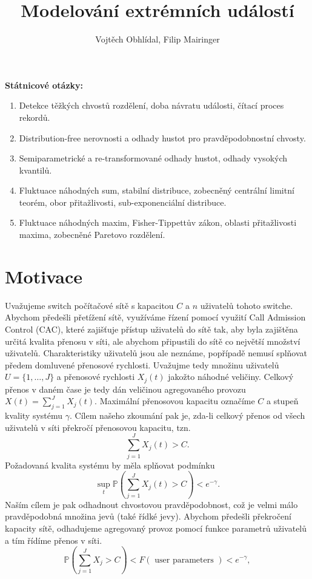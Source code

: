 \documentclass{article}
\title{Modelování extrémních událostí}
\author{Vojtěch Obhlídal, Filip Mairinger}
\theoremstyle{remark}
\theoremstyle{plain}
\theoremstyle{definition}
\theoremstyle{remark}
\begin{document}
\maketitle


\textbf{Státnicové otázky:}

\begin{enumerate}
    \item Detekce těžkých chvostů rozdělení, doba návratu události, čítací proces rekordů.
    \item Distribution-free nerovnosti a odhady hustot pro pravděpodobnostní chvosty.
    \item Semiparametrické a re-transformované odhady hustot, odhady vysokých kvantilů.
    \item Fluktuace náhodných sum, stabilní distribuce, zobecněný centrální limitní teorém, obor přitažlivosti, sub-exponenciální distribuce.
    \item Fluktuace náhodných maxim, Fisher-Tippettův zákon, oblasti přitažlivosti maxima, zobecněné Paretovo rozdělení.
\end{enumerate}


\section{Motivace}

Uvažujeme switch počítačové sítě s kapacitou $C$ a $n$ uživatelů tohoto switche. Abychom předešli přetížení sítě, využíváme řízení pomocí využití Call Admission Control (CAC), které zajišťuje přístup uživatelů do sítě tak, aby byla zajištěna určitá kvalita přenosu v síti, ale abychom připustili do sítě co největší množství uživatelů. Charakteristiky uživatelů jsou ale neznáme, popřípadě nemusí splňovat předem domluvené přenosové rychlosti. 
Uvažujme tedy množinu uživatelů $U = \{1,\dots,J\}$ a přenosové rychlosti $X_j(t)$ jakožto náhodné veličiny. Celkový přenos v daném čase je tedy dán veličinou agregovaného provozu $X(t) = \sum_{j=1}^{J} X_j(t)$. Maximální přenosovou kapacitu označíme $C$ a stupeň kvality systému $\gamma$. Cílem našeho zkoumání pak je, zda-li celkový přenos od všech uživatelů v síti překročí přenosovou kapacitu, tzn.
$$
\sum_{j=1}^{J} X_j(t) > C.
$$
Požadovaná kvalita systému by měla splňovat  podmínku
$$
\sup _{t} \mathbb{P}\left(\sum_{j=1}^{J} X_{j}(t)>C\right)<e^{-\gamma}.
$$
Naším cílem je pak odhadnout chvostovou pravděpodobnost, což je velmi málo pravděpodobná množina jevů (také řídké jevy). Abychom předešli překročení kapacity sítě, odhadujeme agregovaný provoz pomocí funkce parametrů uživatelů a tím řídíme přenos v síti.
$$
\mathbb{P}\left(\sum_{j=1}^{J} X_{j}>C\right)<F(\text { user parameters })<e^{-\gamma},
$$
\end{document}
